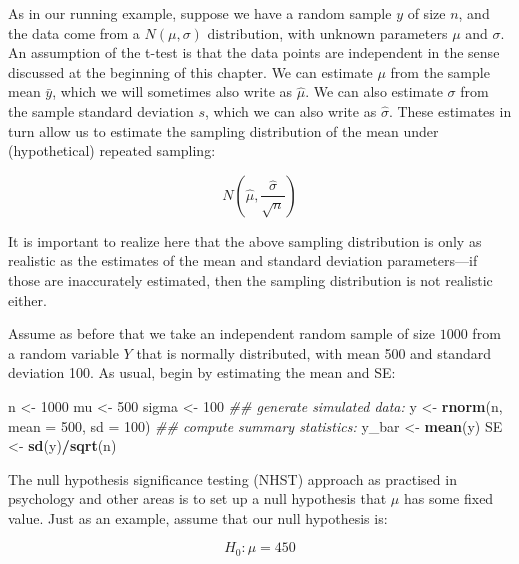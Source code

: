 \documentclass[12pt,]{krantz}
\newenvironment{Shaded}{\begin{snugshade}}{\end{snugshade}}
\newcommand{\CommentTok}[1]{\textcolor[rgb]{0.56,0.35,0.01}{\textit{#1}}}
\newcommand{\DataTypeTok}[1]{\textcolor[rgb]{0.13,0.29,0.53}{#1}}
\newcommand{\DecValTok}[1]{\textcolor[rgb]{0.00,0.00,0.81}{#1}}
\newcommand{\KeywordTok}[1]{\textcolor[rgb]{0.13,0.29,0.53}{\textbf{#1}}}
\newcommand{\NormalTok}[1]{#1}
\newcommand{\OperatorTok}[1]{\textcolor[rgb]{0.81,0.36,0.00}{\textbf{#1}}}
\newcommand{\StringTok}[1]{\textcolor[rgb]{0.31,0.60,0.02}{#1}}
\begin{document}
As in our running example, suppose we have a random sample \(y\) of size \(n\), and the data come from a \(N(\mu,\sigma)\) distribution, with unknown parameters \(\mu\) and \(\sigma\). An assumption of the t-test is that the data points are independent in the sense discussed at the beginning of this chapter.
We can estimate \(\mu\) from the sample mean \(\bar{y}\), which we will sometimes also write as \(\hat \mu\). We can also estimate \(\sigma\) from the sample standard deviation \(s\), which we can also write as \(\hat\sigma\). These estimates in turn allow us to estimate the sampling distribution of the mean under (hypothetical) repeated sampling:

\begin{equation}
N(\hat\mu,\frac{\hat \sigma}{\sqrt{n}})
\end{equation}

It is important to realize here that the above sampling distribution is only as realistic as the estimates of the mean and standard deviation parameters---if those are inaccurately estimated, then the sampling distribution is not realistic either.

Assume as before that we take an independent random sample of size \(1000\) from a random variable \(Y\) that is normally distributed, with mean 500 and standard deviation 100. As usual, begin by estimating the mean and SE:

\begin{Shaded}
\begin{Highlighting}[]
\NormalTok{n <-}\StringTok{ }\DecValTok{1000}
\NormalTok{mu <-}\StringTok{ }\DecValTok{500}
\NormalTok{sigma <-}\StringTok{ }\DecValTok{100}
\CommentTok{## generate simulated data:}
\NormalTok{y <-}\StringTok{ }\KeywordTok{rnorm}\NormalTok{(n, }\DataTypeTok{mean =} \DecValTok{500}\NormalTok{, }\DataTypeTok{sd =} \DecValTok{100}\NormalTok{)}
\CommentTok{## compute summary statistics:}
\NormalTok{y_bar <-}\StringTok{ }\KeywordTok{mean}\NormalTok{(y)}
\NormalTok{SE <-}\StringTok{ }\KeywordTok{sd}\NormalTok{(y)}\OperatorTok{/}\KeywordTok{sqrt}\NormalTok{(n)}
\end{Highlighting}
\end{Shaded}

The null hypothesis significance testing (NHST) approach as practised in psychology and other areas is to set up a null hypothesis that \(\mu\) has some fixed value. Just as an example, assume that our null hypothesis is:

\begin{equation}
H_0: \mu = 450
\end{equation}
\end{document}
